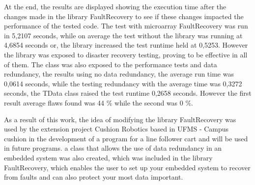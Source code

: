 At the end, the results are displayed showing the execution time after the changes made in the library FaultRecovery to see if these changes impacted the performance of the tested code. The test with microarray FaultRecovery was run in 5,2107 seconds, while on average the test without the library was running at 4,6854 seconds or, the library increased the test runtime held at 0,5253. However the library was exposed to disaster recovery testing, proving to be effective in all of them. The class was also exposed to the performance tests and data redundancy, the results using no data redundancy, the average run time was 0,0614 seconds, while the testing redundancy with the average time was 0,3272 seconds, the TData class raised the test runtime 0,2658 seconds. However the first result average flaws found was 44 \% while the second was 0 \%.

As a result of this work, the idea of modifying the library FaultRecovery was used by the extension project Cushion Robotics based in UFMS - Campus cushion in the development of a program for a line follower cart and will be used in future programs. a class that allows the use of data redundancy in an embedded system was also created, which was included in the library FaultRecovery, which enables the user to set up your embedded system to recover from faults and can also protect your most data important.